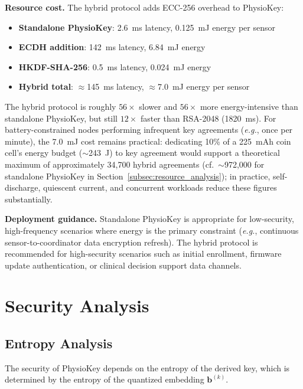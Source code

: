 \documentclass[sensors,article,submit,pdftex,moreauthors]{Definitions/mdpi}
\newcommand{\eg}{\textit{e.g.}}
\begin{document}
\textbf{Resource cost.} The hybrid protocol adds ECC-256 overhead to PhysioKey:

\begin{itemize}
    \item \textbf{Standalone PhysioKey}: 2.6~ms latency, 0.125~mJ energy per sensor
    \item \textbf{ECDH addition}: 142~ms latency, 6.84~mJ energy
    \item \textbf{HKDF-SHA-256}: 0.5~ms latency, 0.024~mJ energy
    \item \textbf{Hybrid total}: $\approx$145~ms latency, $\approx$7.0~mJ energy per sensor
\end{itemize}

The hybrid protocol is roughly $56\times$ slower and $56\times$ more energy-intensive than standalone PhysioKey, but still $12\times$ faster than RSA-2048 (1820~ms). For battery-constrained nodes performing infrequent key agreements (\eg, once per minute), the 7.0~mJ cost remains practical: dedicating 10\% of a 225~mAh coin cell's energy budget ($\sim$243~J) to key agreement would support a theoretical maximum of approximately 34,700 hybrid agreements (cf.\ $\sim$972,000 for standalone PhysioKey in Section~\ref{subsec:resource_analysis}); in practice, self-discharge, quiescent current, and concurrent workloads reduce these figures substantially.

\textbf{Deployment guidance.} Standalone PhysioKey is appropriate for low-security, high-frequency scenarios where energy is the primary constraint (\eg, continuous sensor-to-coordinator data encryption refresh). The hybrid protocol is recommended for high-security scenarios such as initial enrollment, firmware update authentication, or clinical decision support data channels.


\section{Security Analysis}
\label{sec:security}

\subsection{Entropy Analysis}
\label{subsec:entropy}

The security of PhysioKey depends on the entropy of the derived key, which is determined by the entropy of the quantized embedding $\mathbf{b}^{(k)}$.
\end{document}

